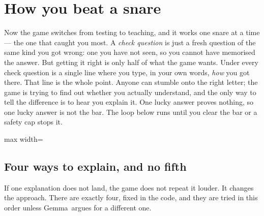 \documentclass[11pt]{article}
\newcommand{\themodel}{Gemma}
\begin{document}
\section{How you beat a snare}

Now the game switches from testing to teaching, and it works one snare at a
time --- the one that caught you most. A \emph{check question} is just a fresh
question of the same kind you got wrong: one you have not seen, so you cannot
have memorised the answer. But getting it right is only half of what the game
wants. Under every check question is a single line where you type, in your own
words, \emph{how} you got there. That line is the whole point. Anyone can
stumble onto the right letter; the game is trying to find out whether you
actually understand, and the only way to tell the difference is to hear you
explain it. One lucky answer proves nothing, so one lucky answer is not the bar.
The loop below runs until you clear the bar or a safety cap stops it.

\vspace{0.5em}
\begin{center}
\begin{adjustbox}{max width=\textwidth}
\end{adjustbox}
\end{center}

\subsection{Four ways to explain, and no fifth}

If one explanation does not land, the game does not repeat it louder. It
changes the approach. There are exactly four, fixed in the code, and they are
tried in this order unless \themodel\ argues for a different one.
\end{document}
